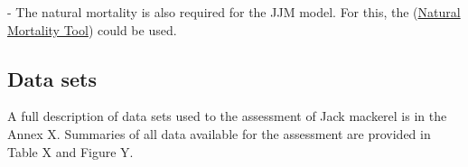 \documentclass{article}
\begin{document}
- The natural mortality is also required for the JJM model. For this, the (\href{https://connect.fisheries.noaa.gov/natural-mortality-tool/}{Natural Mortality Tool}) could be used. 

\subsection{Data sets}

A full description of data sets used to the assessment of Jack mackerel is in the Annex X. Summaries of all data available for the assessment are provided in Table X and Figure Y.
\end{document}
